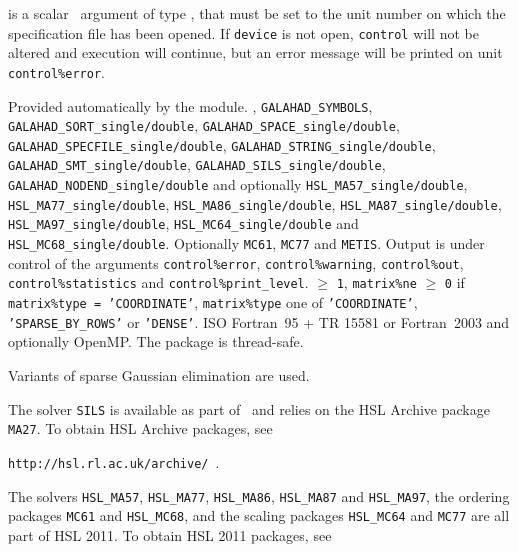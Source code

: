\documentclass{galahad}
\begin{document}
\begin{description}

 is a scalar \intentin\ argument of type \integer,
that must be set to the unit number on which the specification file
has been opened. If {\tt device} is not open, {\tt control} will
not be altered and execution will continue, but an error message
will be printed on unit {\tt control\%error}.

\end{description}


\galgeneral

\galworkspace Provided automatically by the module.
,
{\tt GALAHAD\_SYMBOLS},
{\tt GALAHAD\_SORT\_single/double},
{\tt GALAHAD\_SPACE\-\_single/double},
{\tt GALAHAD\_SPECFILE\_single/double},
{\tt GALAHAD\_STRING\_single/double},
{\tt GALAHAD\_SMT\-\_sin\-gle/double},
{\tt GALAHAD\_SILS\_single/double},
{\tt GALAHAD\_NODEND\_single/double}
and optionally
{\tt HSL\_MA57\_single/double},
{\tt HSL\_MA77\_single/\-double},
{\tt HSL\_MA86\_single/double},
{\tt HSL\_MA87\_single/double},
{\tt HSL\_MA97\_single/double},
{\tt HSL\_MC64\_single\-/double} and
{\tt HSL\_MC68\_single\-/double}.
\galroutines Optionally {\tt MC61}, {\tt MC77} and {\tt METIS}.
\galio Output is under control of the arguments
{\tt control\%error},
{\tt control\%warning},
{\tt control\%out}, \\
{\tt control\-\%statistics}
and {\tt control\%print\_level}.
 $\geq$ {\tt 1},
{\tt matrix\%ne} $\geq$ {\tt 0} if
{\tt matrix\%type = 'COORDINATE'},
{\tt matrix\%type}
one of
{\tt 'COORDINATE'}, {\tt 'SPARSE\_BY\_ROWS'} or   {\tt 'DENSE'}.
\galportability ISO Fortran~95 + TR 15581 or Fortran~2003 and optionally OpenMP.
The package is thread-safe.


\galmethod
Variants of sparse Gaussian elimination are used.

\noindent
The solver {\tt SILS} is available as part of \galahad\ and relies on
the HSL Archive package {\tt MA27}. To obtain HSL Archive packages, see

{\tt http://hsl.rl.ac.uk/archive/ }.

\noindent
The solvers
{\tt HSL\_MA57},
{\tt HSL\_MA77},
{\tt HSL\_MA86},
{\tt HSL\_MA87}
and
{\tt HSL\_MA97}, the ordering packages
{\tt MC61} and {\tt HSL\_MC68}, and the scaling packages
{\tt HSL\_MC64} and {\tt MC77}
are all part of HSL 2011.
To obtain HSL 2011 packages, see
\end{document}
